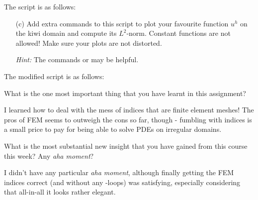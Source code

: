 \begin{problem}{2}
\begin{solution}
The  script is as follows:
\end{solution}
\pagebreak

\begin{itemize}
	\item[(c)] Add extra commands to this script to plot your favourite
	function $u^h$ on the kiwi domain and compute its
	$L^2$-norm. Constant functions are not allowed!
	Make sure your plots are not distorted.
	
	\textit{Hint:} The commands  or 
	may be helpful.
\end{itemize}

\begin{solution}
The modified  script is as follows:
\end{solution}
\pagebreak

\end{problem} %
\pagebreak


\begin{afterword}{}
What is the one most important thing that you have learnt
in this assignment?

\vspace{0.2cm}

I learned how to deal with the mess of indices that are finite
element meshes! The pros of FEM seems to outweigh the cons so
far, though - fumbling with indices is a small price to pay
for being able to solve PDEs on irregular domains.

\vspace{0.8cm}

What is the most substantial new insight that you have gained 
from this course this week? Any \textit{aha moment}?

\vspace{0.2cm}

I didn't have any particular \textit{aha moment}, although
finally getting the FEM indices correct (and without any
-loops) was satisfying, especially considering that
all-in-all it looks rather elegant.

\end{afterword}

\pagebreak

\begin{appendices}


\end{appendices}


